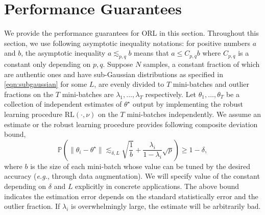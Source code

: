\documentclass[11pt]{article}
\newcommand{\Norm}[1]{ \| #1 \| }
\begin{document}
\section{Performance Guarantees}
We provide the performance guarantees for  ORL in this section. 
Throughout this section, we use following asymptotic inequality notations: for positive numbers $ a $ and $ b $, the asymptotic inequality $ a \lesssim_{p,q} b $ means that $ a \leq C_{p,q}b $ where $C_{p,q}$ is a constant only depending on $p,q$.
	Suppose $ N $ samples, a constant fraction of which are authentic ones and have sub-Gaussian distributions as specified in \eqref{eqn:subgaussian} for some $ L $, are evenly divided to $ T $ mini-batches  and  outlier fractions on the $ T $ mini-batches are $\lambda_1,\ldots,\lambda_T $ respectively. Let $ {\theta}_1, \ldots, {\theta}_T $ be a collection of independent estimates of $ \theta^\star $ output by implementing the robust learning procedure $\mathrm{RL}(\cdot,\nu)$ on the $ T $  mini-batches independently. We assume an estimate or the robust learning procedure provides following composite deviation bound,
	\begin{equation}
	\label{eqn:bound_base_alg}
	\mathbb{P}\left(\Norm{{\theta}_i - \theta^\star}  \lesssim_{\delta,L} \sqrt{\frac{1}{b}} + \frac{\lambda_i}{1-\lambda_i}\sqrt{p}   \right) \geq 1-\delta,
	\end{equation}	
	where $b$ is the size of each mini-batch whose value can be tuned by the desired accuracy (\emph{e.g.}, through data augmentation). We will specify value of the constant depending on $\delta$ and $L$ explicitly in concrete applications. The above bound indicates the estimation error depends on the standard statistically error and the outlier fraction.  If $\lambda_i$ is overwhelmingly large, the estimate will be arbitrarily bad.
\end{document}
